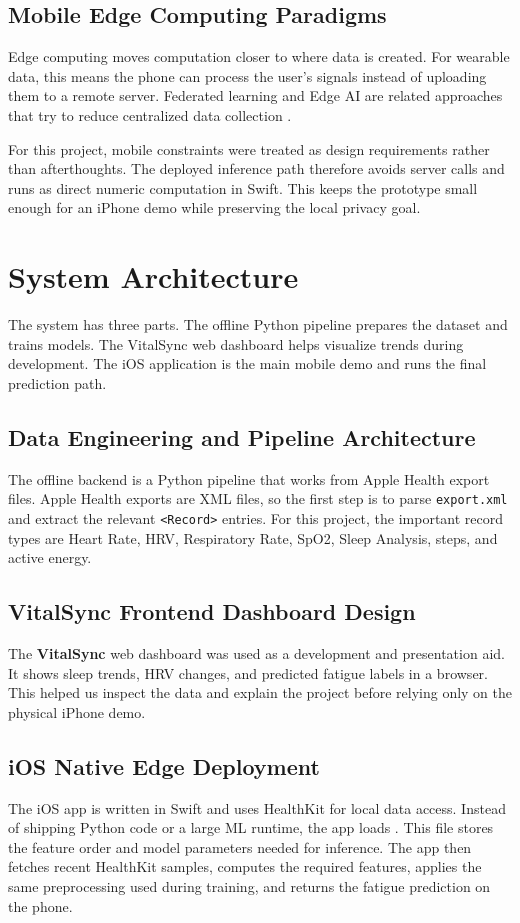 \documentclass[sigconf,10pt]{acmart}
\begin{document}
\subsection{Mobile Edge Computing Paradigms}
Edge computing moves computation closer to where data is created. For wearable data, this means the phone can process the user's signals instead of uploading them to a remote server. Federated learning and Edge AI are related approaches that try to reduce centralized data collection \cite{mcmahan2017federated, raskar2020edge}. 

For this project, mobile constraints were treated as design requirements rather than afterthoughts. The deployed inference path therefore avoids server calls and runs as direct numeric computation in Swift. This keeps the prototype small enough for an iPhone demo while preserving the local privacy goal.

\section{System Architecture}

The system has three parts. The offline Python pipeline prepares the dataset and trains models. The VitalSync web dashboard helps visualize trends during development. The iOS application is the main mobile demo and runs the final prediction path.

\subsection{Data Engineering and Pipeline Architecture}
The offline backend is a Python pipeline that works from Apple Health export files. Apple Health exports are XML files, so the first step is to parse \texttt{export.xml} and extract the relevant \texttt{\textless Record\textgreater} entries. For this project, the important record types are Heart Rate, HRV, Respiratory Rate, SpO2, Sleep Analysis, steps, and active energy.

\subsection{VitalSync Frontend Dashboard Design}
The \textbf{VitalSync} web dashboard was used as a development and presentation aid. It shows sleep trends, HRV changes, and predicted fatigue labels in a browser. This helped us inspect the data and explain the project before relying only on the physical iPhone demo.

\subsection{iOS Native Edge Deployment}
The iOS app is written in Swift and uses HealthKit for local data access. Instead of shipping Python code or a large ML runtime, the app loads . This file stores the feature order and model parameters needed for inference. The app then fetches recent HealthKit samples, computes the required features, applies the same preprocessing used during training, and returns the fatigue prediction on the phone.
\end{document}
